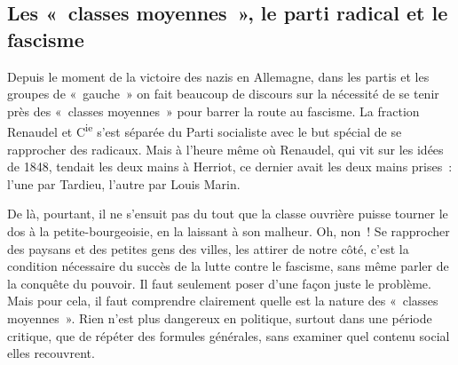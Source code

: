 \documentclass[french,twoside]{book} %
\begin{document}
\subsection[{Les « classes moyennes », le parti radical et le fascisme}]{Les « classes moyennes », le parti radical et le fascisme}
\noindent Depuis le moment de la victoire des nazis en Allemagne, dans les partis et les groupes de « gauche » on fait beaucoup de discours sur la nécessité de se tenir près des « classes moyennes » pour barrer la route au fascisme. La fraction Renaudel et C\textsuperscript{ie} s’est séparée du Parti socialiste avec le but spécial de se rapprocher des radicaux. Mais à l’heure même où Renaudel, qui vit sur les idées de 1848, tendait les deux mains à Herriot, ce dernier avait les deux mains prises : l’une par Tardieu, l’autre par Louis Marin.\par
De là, pourtant, il ne s’ensuit pas du tout que la classe ouvrière puisse tourner le dos à la petite-bourgeoisie, en la laissant à son malheur. Oh, non ! Se rapprocher des paysans et des petites gens des villes, les attirer de notre côté, c’est la condition nécessaire du succès de la lutte contre le fascisme, sans même parler de la conquête du pouvoir. Il faut seulement poser d’une façon juste le problème. Mais pour cela, il faut comprendre clairement quelle est la nature des « classes moyennes ». Rien n’est plus dangereux en politique, surtout dans une période critique, que de répéter des formules générales, sans examiner quel contenu social elles recouvrent.\par
\end{document}
